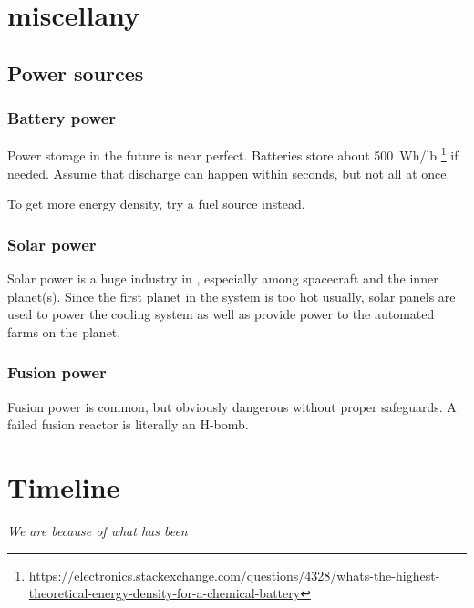 \section{ miscellany}
\label{sec:system51-miscellany}

\subsection{Power sources}
\label{sec:power-sources}

\subsubsection{Battery power}
\label{sec:battery-power}

Power storage in the future is near perfect. Batteries store about 500~Wh/lb%
\footnote{\url{https://electronics.stackexchange.com/questions/4328/whats-the-highest-theoretical-energy-density-for-a-chemical-battery}}
if needed. Assume that discharge can happen within seconds, but not all at once.

To get more energy density, try a fuel source instead.

\subsubsection{Solar power}
\label{sec:solar-power}

Solar power is a huge industry in , especially among spacecraft and
the inner planet(s). Since the first planet in the system is too hot usually,
solar panels are used to power the cooling system as well as provide power to
the automated farms on the planet.

\subsubsection{Fusion power}
\label{sec:fusion-power}

Fusion power is common, but obviously dangerous without proper safeguards. A
failed fusion reactor is literally an H-bomb.



\section{Timeline}
\label{sec:timeline}

\begin{center}
  \textit{We are because of what has been}
\end{center}


